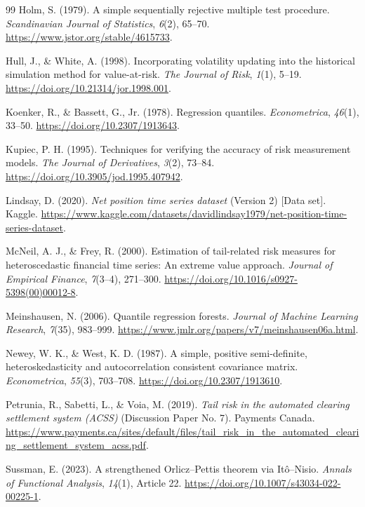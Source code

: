 \documentclass[11pt,a4paper]{article}
\begin{document}
\begin{thebibliography}{99}
 Holm, S. (1979). A simple sequentially rejective multiple test procedure. \emph{Scandinavian Journal of Statistics}, \emph{6}(2), 65--70. \url{https://www.jstor.org/stable/4615733}.

 Hull, J., \& White, A. (1998). Incorporating volatility updating into the historical simulation method for value-at-risk. \emph{The Journal of Risk}, \emph{1}(1), 5--19. \url{https://doi.org/10.21314/jor.1998.001}.

 Koenker, R., \& Bassett, G., Jr. (1978). Regression quantiles. \emph{Econometrica}, \emph{46}(1), 33--50. \url{https://doi.org/10.2307/1913643}.

 Kupiec, P. H. (1995). Techniques for verifying the accuracy of risk measurement models. \emph{The Journal of Derivatives}, \emph{3}(2), 73--84. \url{https://doi.org/10.3905/jod.1995.407942}.

 Lindsay, D. (2020). \emph{Net position time series dataset} (Version 2) [Data set]. Kaggle. \url{https://www.kaggle.com/datasets/davidlindsay1979/net-position-time-series-dataset}.

 McNeil, A. J., \& Frey, R. (2000). Estimation of tail-related risk measures for heteroscedastic financial time series: An extreme value approach. \emph{Journal of Empirical Finance}, \emph{7}(3--4), 271--300. \url{https://doi.org/10.1016/s0927-5398(00)00012-8}.

 Meinshausen, N. (2006). Quantile regression forests. \emph{Journal of Machine Learning Research}, \emph{7}(35), 983--999. \url{https://www.jmlr.org/papers/v7/meinshausen06a.html}.

 Newey, W. K., \& West, K. D. (1987). A simple, positive semi-definite, heteroskedasticity and autocorrelation consistent covariance matrix. \emph{Econometrica}, \emph{55}(3), 703--708. \url{https://doi.org/10.2307/1913610}.

 Petrunia, R., Sabetti, L., \& Voia, M. (2019). \emph{Tail risk in the automated clearing settlement system (ACSS)} (Discussion Paper No. 7). Payments Canada. \url{https://www.payments.ca/sites/default/files/tail_risk_in_the_automated_clearing_settlement_system_acss.pdf}.

 Sussman, E. (2023). A strengthened Orlicz--Pettis theorem via Itô--Nisio. \emph{Annals of Functional Analysis}, \emph{14}(1), Article 22. \url{https://doi.org/10.1007/s43034-022-00225-1}.


\end{thebibliography}
\end{document}
